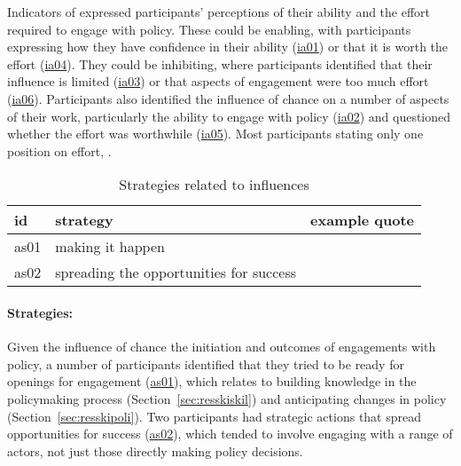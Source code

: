 Indicators of \skiagen{} expressed participants' perceptions of their ability and the effort required to engage with policy. These could be enabling, with participants expressing how they have confidence in their ability (\hyperref[tab:resskiagen]{ia01}) or that it is worth the effort (\hyperref[tab:resskiagen]{ia04}). They could be inhibiting, where participants identified that their influence is limited (\hyperref[tab:resskiagen]{ia03}) or that aspects of engagement were too much effort (\hyperref[tab:resskiagen]{ia06}). Participants also identified the influence of chance on a number of aspects of their work, particularly the ability to engage with policy (\hyperref[tab:resskiagen]{ia02}) and questioned whether the effort was worthwhile (\hyperref[tab:resskiagen]{ia05}). Most participants stating only one position on effort, . 

\begin{table}[!ht]
\footnotesize
\caption{Strategies related to \skiagen{} influences}\label{tab:resskiagenstrat}
\begin{tabular}{L{.06\linewidth}L{.3\linewidth}L{.64\linewidth}} \hline
\textbf{id} & \textbf{strategy} & \textbf{example quote} \\ \hline \hline
as01 & making it happen &  \\[5mm]
as02 & spreading the opportunities for success &  \\[5mm]
\hline
 \end{tabular}
\end{table}

\paragraph{Strategies:}
Given the influence of chance the initiation and outcomes of engagements with policy, a number of participants identified that they tried to be ready for openings for engagement (\hyperref[tab:resskiagenstrat]{as01}), which relates to building knowledge in the policymaking process (Section~\ref{sec:resskiskil}) and anticipating changes in policy (Section~\ref{sec:resskipoli}). Two participants had strategic actions that spread opportunities for success (\hyperref[tab:resskiagenstrat]{as02}), which tended to involve engaging with a range of actors, not just those directly making policy decisions.

